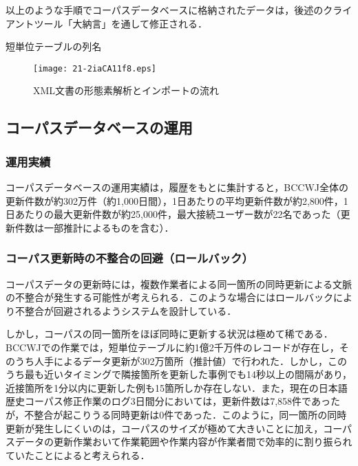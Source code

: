 \documentclass[japanese]{jnlp_1.4}
\begin{document}
以上のような手順でコーパスデータベースに格納されたデータは，後述のクライアントツール「大納言」を通して修正される．

\begin{table}[t]
\caption{短単位テーブルの列名}
\label{tab8}

\end{table}

\begin{figure}[t]
\begin{center}
\texttt{[image: 21-2iaCA11f8.eps]}
\end{center}
\caption{XML文書の形態素解析とインポートの流れ}
\label{fig8}
\end{figure}


\subsection{コーパスデータベースの運用}

\subsubsection*{運用実績}

コーパスデータベースの運用実績は，履歴をもとに集計すると，BCCWJ全体の更新件数が約302万件（約1,000日間），1日あたりの平均更新件数が約2,800件，1日あたりの最大更新件数が約25,000件，最大接続ユーザー数が22名であった（更新件数は一部推計によるものを含む）．

\subsubsection*{コーパス更新時の不整合の回避（ロールバック）}

コーパスデータの更新時には，複数作業者による同一箇所の同時更新による文脈の不整合が発生する可能性が考えられる．このような場合にはロールバックにより不整合が回避されるようシステムを設計している．

しかし，コーパスの同一箇所をほぼ同時に更新する状況は極めて稀である．BCCWJでの作業では，短単位テーブルに約1億2千万件のレコードが存在し，そのうち人手によるデータ更新が302万箇所（推計値）で行われた．しかし，このうち最も近いタイミングで隣接箇所を更新した事例でも14秒以上の間隔があり，近接箇所を1分以内に更新した例も15箇所しか存在しない．また，現在の日本語歴史コーパス修正作業のログ3日間分においては，更新件数は7,858件であったが，不整合が起こりうる同時更新は0件であった．このように，同一箇所の同時更新が発生しにくいのは，コーパスのサイズが極めて大きいことに加え，コーパスデータの更新作業おいて作業範囲や作業内容が作業者間で効率的に割り振られていたことによると考えられる．
\end{document}
